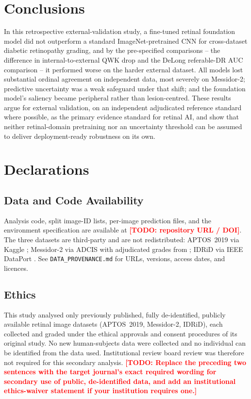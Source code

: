 \documentclass[11pt,a4paper]{article}
\newcommand{\todo}[1]{\textcolor{red}{\textbf{[TODO: #1]}}}
\begin{document}
\section{Conclusions}

In this retrospective external-validation study, a fine-tuned retinal foundation
model did not outperform a standard ImageNet-pretrained CNN for cross-dataset
diabetic retinopathy grading, and by the pre-specified comparisons -- the
difference in internal-to-external QWK drop and the DeLong referable-DR AUC
comparison -- it performed worse on the harder external dataset. All models
lost substantial ordinal agreement on independent data, most severely on
Messidor-2; predictive uncertainty was a weak safeguard under that shift; and the
foundation model's saliency became peripheral rather than lesion-centred. These
results argue for external validation, on an independent adjudicated reference
standard where possible, as the primary evidence standard for retinal AI, and
show that neither retinal-domain pretraining nor an uncertainty threshold can be
assumed to deliver deployment-ready robustness on its own.

\section*{Declarations}

\subsection*{Data and Code Availability}
\label{sec:availability}
Analysis code, split image-ID lists, per-image prediction files, and the
environment specification are available at \todo{repository URL / DOI}. The three
datasets are third-party and are not redistributed: APTOS~2019 via Kaggle
\citep{aptos2019}; Messidor-2 via ADCIS \citep{decenciere2014} with adjudicated
grades from \citep{krause2018}; IDRiD via IEEE DataPort \citep{porwal2018}. See
\texttt{DATA\_PROVENANCE.md} for URLs, versions, access dates, and licences.

\subsection*{Ethics}
This study analysed only previously published, fully de-identified, publicly
available retinal image datasets (APTOS~2019, Messidor-2, IDRiD), each collected
and graded under the ethical approvals and consent procedures of its original
study. No new human-subjects data were collected and no individual can be
identified from the data used. Institutional review board review was therefore
not required for this secondary analysis.
\todo{Replace the preceding two sentences with the target journal's exact
required wording for secondary use of public, de-identified data, and add an
institutional ethics-waiver statement if your institution requires one.}
\end{document}
